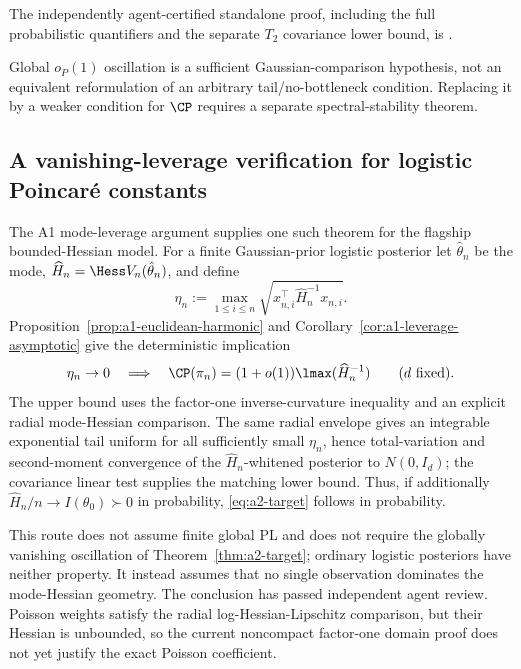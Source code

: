 \documentclass[../../main.tex]{subfiles}
\begin{document}
\noindent The independently agent-certified standalone proof, including the full probabilistic
quantifiers and the separate $T_2$ covariance lower bound, is
.

\noindent Global $o_P(1)$ oscillation is a sufficient Gaussian-comparison hypothesis, not an
equivalent reformulation of an arbitrary tail/no-bottleneck condition. Replacing it by a weaker
condition for $\CP$ requires a separate spectral-stability theorem.

\subsection{A vanishing-leverage verification for logistic Poincar\'e constants}
\label{subsec:a2-leverage}

The A1 mode-leverage argument supplies one such theorem for the flagship bounded-Hessian model.
For a finite Gaussian-prior logistic posterior let $\hat\theta_n$ be the mode,
$\widehat H_n=\Hess V_n(\hat\theta_n)$, and define
\begin{equation}\label{eq:a2-max-leverage}
 \eta_n:=\max_{1\le i\le n}\sqrt{x_{n,i}^\top\widehat H_n^{-1}x_{n,i}}.
\end{equation}
Proposition~\ref{prop:a1-euclidean-harmonic} and
Corollary~\ref{cor:a1-leverage-asymptotic} give the deterministic implication
\begin{equation}\label{eq:a2-leverage-limit}
 \eta_n\to0
 \quad\Longrightarrow\quad
 \CP(\pi_n)=(1+o(1))\lmax(\widehat H_n^{-1})
 \qquad(d\text{ fixed}).
\end{equation}
The upper bound uses the factor-one inverse-curvature inequality and an explicit radial
mode-Hessian comparison. The same radial envelope gives an integrable exponential tail uniform
for all sufficiently small $\eta_n$, hence total-variation and second-moment convergence of the
$\widehat H_n$-whitened posterior to $N(0,I_d)$; the covariance linear test supplies the matching
lower bound. Thus, if additionally $\widehat H_n/n\to I(\theta_0)\succ0$ in probability,
\eqref{eq:a2-target} follows in probability.

This route does not assume finite global PL and does not require the globally vanishing
oscillation of Theorem~\ref{thm:a2-target}; ordinary logistic posteriors have neither property.
It instead assumes that no single observation dominates the mode-Hessian geometry. The conclusion
has passed independent agent review. Poisson weights satisfy the radial log-Hessian-Lipschitz
comparison, but their Hessian is unbounded, so the current noncompact factor-one domain proof does
not yet justify the exact Poisson coefficient.
\end{document}
